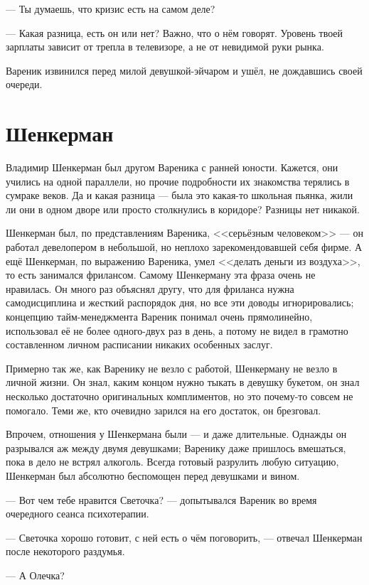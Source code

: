\documentclass[a4paper,10pt,fleqn]{book}\usepackage{polyglossia}\setdefaultlanguage{english}\setotherlanguage{russian}\defaultfontfeatures{Ligatures=TeX,Mapping=tex-text} \usepackage{xcolor}\definecolor{lightgray}{HTML}{bbbbbb}\color{lightgray}\newcommand{\ml}[3]{\textcolor{black}{#3}}
\begin{document}
--- Ты думаешь, что кризис есть на самом деле?

--- Какая разница, есть он или нет?
Важно, что о нём говорят.
Уровень твоей зарплаты зависит от трепла в телевизоре, а не от невидимой руки рынка.

Вареник извинился перед милой девушкой-эйчаром и ушёл, не дождавшись своей очереди.

\section{Шенкерман}

Владимир Шенкерман был другом Вареника с ранней юности.
Кажется, они учились на одной параллели, но прочие подробности их знакомства терялись в сумраке веков.
Да и какая разница --- была это какая-то школьная пьянка, жили ли они в одном дворе или просто столкнулись в коридоре?
Разницы нет никакой.

Шенкерман был, по представлениям Вареника, <<серьёзным человеком>> --- он работал девелопером в небольшой, но неплохо зарекомендовавшей себя фирме.
А ещё Шенкерман, по выражению Вареника, умел <<делать деньги из воздуха>>, то есть занимался фрилансом.
Самому Шенкерману эта фраза очень не нравилась.
Он много раз объяснял другу, что для фриланса нужна самодисциплина и жесткий распорядок дня, но все эти доводы игнорировались;
концепцию тайм-менеджмента Вареник понимал очень прямолинейно, использовал её не более одного-двух раз в день, а потому не видел в грамотно составленном личном расписании никаких особенных заслуг.

Примерно так же, как Варенику не везло с работой, Шенкерману не везло в личной жизни.
Он знал, каким концом нужно тыкать в девушку букетом, он знал несколько достаточно оригинальных комплиментов, но это почему-то совсем не помогало.
Теми же, кто очевидно зарился на его достаток, он брезговал.

Впрочем, отношения у Шенкермана были --- и даже длительные.
Однажды он разрывался аж между двумя девушками;
Варенику даже пришлось вмешаться, пока в дело не встрял алкоголь.
Всегда готовый разрулить любую ситуацию, Шенкерман был абсолютно беспомощен перед девушками и вином.

--- Вот чем тебе нравится Светочка? --- допытывался Вареник во время очередного сеанса психотерапии.

--- Светочка хорошо готовит, с ней есть о чём поговорить, --- отвечал Шенкерман после некоторого раздумья.

--- А Олечка?
\end{document}
